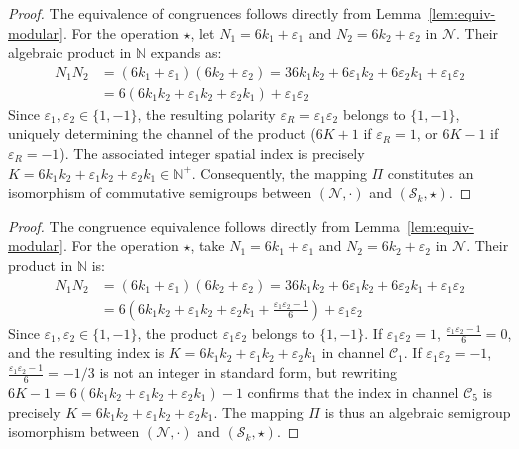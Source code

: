 \documentclass{article}
\numberwithin{equation}{section}
\theoremstyle{plain}
\theoremstyle{definition}
\begin{document}
\begin{proof}
The equivalence of congruences follows directly from Lemma~\ref{lem:equiv-modular}. For the operation $\star$, let $N_1 = 6k_1 + \varepsilon_1$ and $N_2 = 6k_2 + \varepsilon_2$ in $\mathcal{N}$. Their algebraic product in $\mathbb{N}$ expands as:
\begin{align}
N_1 N_2 &= (6k_1 + \varepsilon_1)(6k_2 + \varepsilon_2) = 36 k_1 k_2 + 6 \varepsilon_1 k_2 + 6 \varepsilon_2 k_1 + \varepsilon_1 \varepsilon_2 \nonumber \\
&= 6 \left( 6 k_1 k_2 + \varepsilon_1 k_2 + \varepsilon_2 k_1 \right) + \varepsilon_1 \varepsilon_2
\end{align}
Since $\varepsilon_1, \varepsilon_2 \in \{1, -1\}$, the resulting polarity $\varepsilon_R = \varepsilon_1 \varepsilon_2$ belongs to $\{1, -1\}$, uniquely determining the channel of the product ($6K + 1$ if $\varepsilon_R = 1$, or $6K - 1$ if $\varepsilon_R = -1$). The associated integer spatial index is precisely $K = 6k_1k_2 + \varepsilon_1 k_2 + \varepsilon_2 k_1 \in \mathbb{N}^+$. Consequently, the mapping $\Pi$ constitutes an isomorphism of commutative semigroups between $(\mathcal{N}, \cdot)$ and $(\mathcal{S}_k, \star)$.
\end{proof}

\begin{proof}
The congruence equivalence follows directly from Lemma~\ref{lem:equiv-modular}. For the operation $\star$, take $N_1 = 6k_1 + \varepsilon_1$ and $N_2 = 6k_2 + \varepsilon_2$ in $\mathcal{N}$. Their product in $\mathbb{N}$ is:
\begin{align}
N_1 N_2 &= (6k_1 + \varepsilon_1)(6k_2 + \varepsilon_2) = 36 k_1 k_2 + 6 \varepsilon_1 k_2 + 6 \varepsilon_2 k_1 + \varepsilon_1 \varepsilon_2 \nonumber \\
&= 6 \left( 6 k_1 k_2 + \varepsilon_1 k_2 + \varepsilon_2 k_1 + \frac{\varepsilon_1 \varepsilon_2 - 1}{6} \right) + \varepsilon_1 \varepsilon_2
\end{align}
Since $\varepsilon_1, \varepsilon_2 \in \{1, -1\}$, the product $\varepsilon_1 \varepsilon_2$ belongs to $\{1, -1\}$. If $\varepsilon_1 \varepsilon_2 = 1$, $\frac{\varepsilon_1 \varepsilon_2 - 1}{6} = 0$, and the resulting index is $K = 6k_1k_2 + \varepsilon_1 k_2 + \varepsilon_2 k_1$ in channel $\mathcal{C}_1$. If $\varepsilon_1 \varepsilon_2 = -1$, $\frac{\varepsilon_1 \varepsilon_2 - 1}{6} = -1/3$ is not an integer in standard form, but rewriting $6K - 1 = 6(6k_1k_2 + \varepsilon_1 k_2 + \varepsilon_2 k_1) - 1$ confirms that the index in channel $\mathcal{C}_5$ is precisely $K = 6k_1k_2 + \varepsilon_1 k_2 + \varepsilon_2 k_1$. The mapping $\Pi$ is thus an algebraic semigroup isomorphism between $(\mathcal{N}, \cdot)$ and $(\mathcal{S}_k, \star)$.
\end{proof}
\end{document}
